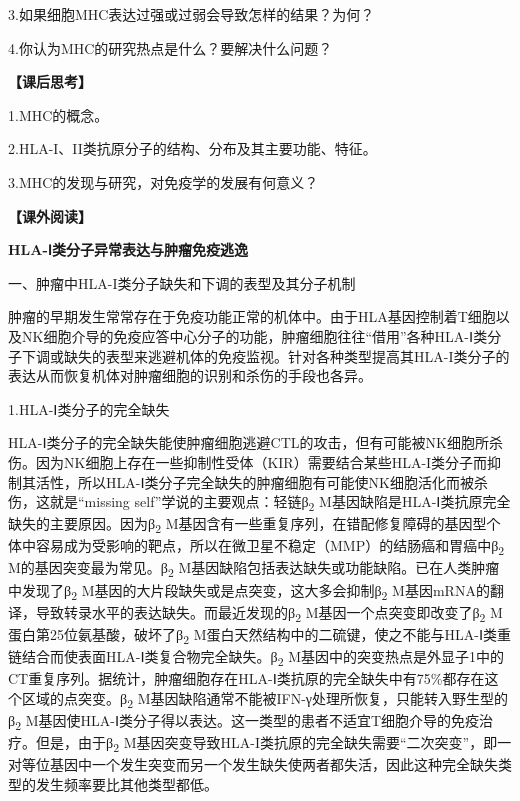3.如果细胞MHC表达过强或过弱会导致怎样的结果？为何？

4.你认为MHC的研究热点是什么？要解决什么问题？

\noindent\textbf{【课后思考】}

1.MHC的概念。

2.HLA-I、II类抗原分子的结构、分布及其主要功能、特征。

3.MHC的发现与研究，对免疫学的发展有何意义？

\noindent\textbf{【课外阅读】}
\begin{center}
    \textbf{\Large HLA-Ⅰ类分子异常表达与肿瘤免疫逃逸}
\end{center}

\begin{center}
    {\large 一、肿瘤中HLA-I类分子缺失和下调的表型及其分子机制}
\end{center}

肿瘤的早期发生常常存在于免疫功能正常的机体中。由于HLA基因控制着T细胞以及NK细胞介导的免疫应答中心分子的功能，肿瘤细胞往往“借用”各种HLA-Ⅰ类分子下调或缺失的表型来逃避机体的免疫监视。针对各种类型提高其HLA-I类分子的表达从而恢复机体对肿瘤细胞的识别和杀伤的手段也各异。

1.HLA-Ⅰ类分子的完全缺失

HLA-Ⅰ类分子的完全缺失能使肿瘤细胞逃避CTL的攻击，但有可能被NK细胞所杀伤。因为NK细胞上存在一些抑制性受体（KIR）需要结合某些HLA-I类分子而抑制其活性，所以HLA-Ⅰ类分子完全缺失的肿瘤细胞有可能使NK细胞活化而被杀伤，这就是“missing
self”学说的主要观点：轻链β\textsubscript{2}
M基因缺陷是HLA-Ⅰ类抗原完全缺失的主要原因。因为β\textsubscript{2}
M基因含有一些重复序列，在错配修复障碍的基因型个体中容易成为受影响的靶点，所以在微卫星不稳定（MMP）的结肠癌和胃癌中β\textsubscript{2}
M的基因突变最为常见。β\textsubscript{2}
M基因缺陷包括表达缺失或功能缺陷。已在人类肿瘤中发现了β\textsubscript{2}
M基因的大片段缺失或是点突变，这大多会抑制β\textsubscript{2}
M基因mRNA的翻译，导致转录水平的表达缺失。而最近发现的β\textsubscript{2}
M基因一个点突变即改变了β\textsubscript{2}
M蛋白第25位氨基酸，破坏了β\textsubscript{2}
M蛋白天然结构中的二硫键，使之不能与HLA-Ⅰ类重链结合而使表面HLA-Ⅰ类复合物完全缺失。β\textsubscript{2}
M基因中的突变热点是外显子1中的CT重复序列。据统计，肿瘤细胞存在HLA-Ⅰ类抗原的完全缺失中有75\%都存在这个区域的点突变。β\textsubscript{2}
M基因缺陷通常不能被IFN-γ处理所恢复，只能转入野生型的β\textsubscript{2}
M基因使HLA-Ⅰ类分子得以表达。这一类型的患者不适宜T细胞介导的免疫治疗。但是，由于β\textsubscript{2}
M基因突变导致HLA-I类抗原的完全缺失需要“二次突变”，即一对等位基因中一个发生突变而另一个发生缺失使两者都失活，因此这种完全缺失类型的发生频率要比其他类型都低。

